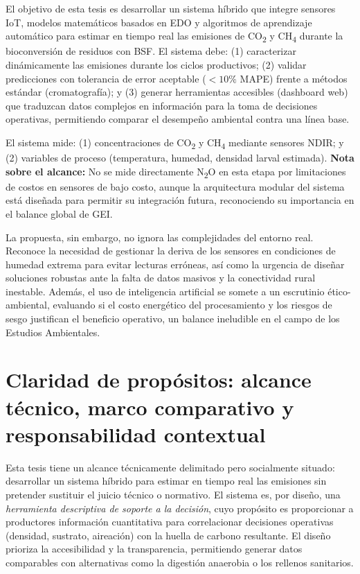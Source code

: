 El objetivo de esta tesis es desarrollar un sistema híbrido que integre sensores IoT, modelos matemáticos basados en EDO y algoritmos de aprendizaje automático para estimar en tiempo real las emisiones de CO\textsubscript{2} y CH\textsubscript{4} durante la bioconversión de residuos con BSF. El sistema debe: (1) caracterizar dinámicamente las emisiones durante los ciclos productivos; (2) validar predicciones con tolerancia de error aceptable ($<10\%$ MAPE) frente a métodos estándar (cromatografía); y (3) generar herramientas accesibles (dashboard web) que traduzcan datos complejos en información para la toma de decisiones operativas, permitiendo comparar el desempeño ambiental contra una línea base.

El sistema mide: (1) concentraciones de CO\textsubscript{2} y CH\textsubscript{4} mediante sensores NDIR; y (2) variables de proceso (temperatura, humedad, densidad larval estimada). \textbf{Nota sobre el alcance:} No se mide directamente N\textsubscript{2}O en esta etapa por limitaciones de costos en sensores de bajo costo, aunque la arquitectura modular del sistema está diseñada para permitir su integración futura, reconociendo su importancia en el balance global de GEI.

La propuesta, sin embargo, no ignora las complejidades del entorno real. Reconoce la necesidad de gestionar la deriva de los sensores en condiciones de humedad extrema para evitar lecturas erróneas, así como la urgencia de diseñar soluciones robustas ante la falta de datos masivos y la conectividad rural inestable. Además, el uso de inteligencia artificial se somete a un escrutinio ético-ambiental, evaluando si el costo energético del procesamiento y los riesgos de sesgo justifican el beneficio operativo, un balance ineludible en el campo de los Estudios Ambientales.

\section*{Claridad de propósitos: alcance técnico, marco comparativo y responsabilidad contextual}

Esta tesis tiene un alcance técnicamente delimitado pero socialmente situado: desarrollar un sistema híbrido para estimar en tiempo real las emisiones sin pretender sustituir el juicio técnico o normativo. El sistema es, por diseño, una \textit{herramienta descriptiva de soporte a la decisión}, cuyo propósito es proporcionar a productores información cuantitativa para correlacionar decisiones operativas (densidad, sustrato, aireación) con la huella de carbono resultante. El diseño prioriza la accesibilidad y la transparencia, permitiendo generar datos comparables con alternativas como la digestión anaerobia o los rellenos sanitarios.

